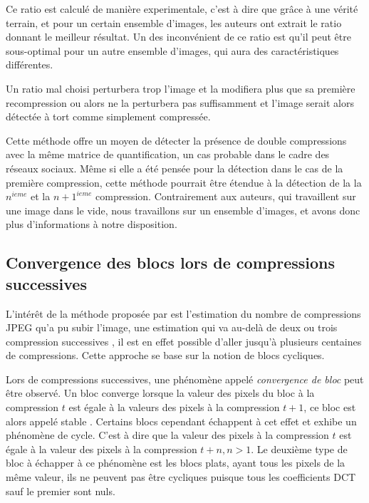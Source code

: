 \documentclass[utf8,final]{stageM2R} %
\begin{document}
Ce ratio est calculé de manière experimentale, c'est à dire que grâce à une vérité terrain, et pour un certain ensemble d'images, les auteurs ont extrait le ratio donnant le meilleur résultat. Un des inconvénient de ce ratio est qu'il peut être sous-optimal pour un autre ensemble d'images, qui aura des caractéristiques différentes.

Un ratio mal choisi perturbera trop l'image et la modifiera plus que sa première recompression ou alors ne la perturbera pas suffisamment et l'image serait alors détectée à tort comme simplement compressée.

Cette méthode offre un moyen de détecter la présence de double compressions avec la même matrice de quantification, un cas probable dans le cadre des réseaux sociaux. Même si elle a été pensée pour la détection dans le cas de la première compression, cette méthode pourrait être étendue à la détection de la la $n^{ieme}$ et la $n+1^{ieme}$ compression. Contrairement aux auteurs, qui travaillent sur une image dans le vide, nous travaillons sur un ensemble d'images, et avons donc plus d'informations à notre disposition.

\subsection{Convergence des blocs lors de compressions successives}
\label{convergence}
L'intérêt de la méthode proposée par  \autocite{CarneinSB2016TelltaleWatermarks} est l'estimation du nombre de compressions JPEG qu'a pu subir l'image, une estimation qui va au-delà de deux ou trois compression successives \autocite{huang2010detecting}\autocite{lukavs2003estimation}, il est en effet possible d'aller jusqu'à plusieurs centaines de compressions. Cette approche se base sur la notion de blocs cycliques.

Lors de compressions successives, une phénomène appelé \textit{convergence de bloc} peut être observé. Un bloc converge lorsque la valeur des pixels du bloc à la compression $t$ est égale à la valeurs des pixels à la compression $t + 1$, ce bloc est alors appelé stable \autocite{lai2013block}. Certains blocs cependant échappent à cet effet et exhibe un phénomène de cycle. C'est à dire que la valeur des pixels à la compression $t$ est égale à la valeur des pixels à la compression $t + n, n > 1$. Le deuxième type de bloc à échapper à ce phénomène est les blocs plats, ayant tous les pixels de la même valeur, ils ne peuvent pas être cycliques puisque tous les coefficients DCT sauf le premier sont nuls.
\end{document}
